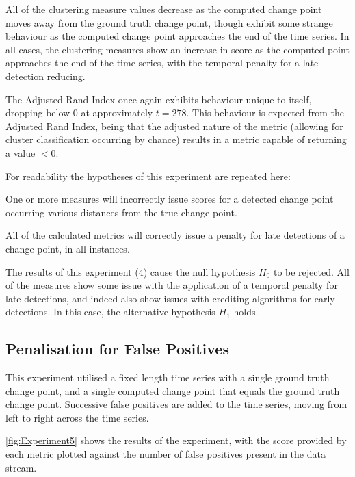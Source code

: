 \documentclass[../main.tex]{subfiles}
\begin{document}
All of the clustering measure values decrease as the computed change point moves away from the ground truth change point, though exhibit some strange behaviour as the computed change point approaches the end of the time series. In all cases, the clustering measures show an increase in score as the computed point approaches the end of the time series, with the temporal penalty for a late detection reducing.

The Adjusted Rand Index once again exhibits behaviour unique to itself, dropping below $0$ at approximately $t=278$. This behaviour is expected from the Adjusted Rand Index, being that the adjusted nature of the metric (allowing for cluster classification occurring by chance) results in a metric capable of returning a value $<0$.

For readability the hypotheses of this experiment are repeated here:

\begin{hypothesis*}
    One or more measures will incorrectly issue scores for a detected change point occurring various distances from the true change point.
\end{hypothesis*}

\begin{nullhypothesis*}
    All of the calculated metrics will correctly issue a penalty for late detections of a change point, in all instances.
\end{nullhypothesis*}

The results of this experiment (4) cause the null hypothesis $H_0$ to be rejected. All of the measures show some issue with the application of a temporal penalty for late detections, and indeed also show issues with crediting algorithms for early detections. In this case, the alternative hypothesis $H_1$ holds.

\subsection{Penalisation for False Positives}

This experiment utilised a fixed length time series with a single ground truth change point, and a single computed change point that equals the ground truth change point. Successive false positives are added to the time series, moving from left to right across the time series.

\autoref{fig:Experiment5} shows the results of the experiment, with the score provided by each metric plotted against the number of false positives present in the data stream.
\end{document}
